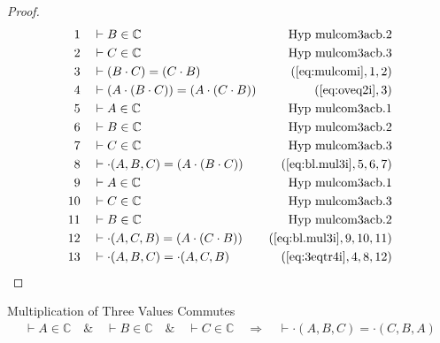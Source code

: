 \begin{proof}
\begin{align}
  1 &&  & \vdash B \in \mathbb{C}&\text{Hyp~mulcom3acb.2}\notag%
  \\ 2 &&  & \vdash C \in
\mathbb{C}&\text{Hyp~mulcom3acb.3}\notag%
  \\ 3 &&  & \vdash ( B \cdot C ) = ( C \cdot B )&(\mbox{\ref{eq:mulcomi}},1,2)\notag
  \\ 4 &&  & \vdash ( A \cdot ( B \cdot C ) ) = ( A \cdot ( C \cdot B ) )&(\mbox{\ref{eq:oveq2i}},3)\notag
  \\ 5 &&  & \vdash A \in
\mathbb{C}&\text{Hyp~mulcom3acb.1}\notag%
  \\ 6 &&  & \vdash B \in
\mathbb{C}&\text{Hyp~mulcom3acb.2}\notag%
  \\ 7 &&  & \vdash C \in
\mathbb{C}&\text{Hyp~mulcom3acb.3}\notag%
  \\ 8 &&  & \vdash \cdot( A , B , C ) = ( A \cdot ( B \cdot C ) )&(\mbox{\ref{eq:bl.mul3i}},5,6,7)\notag
  \\ 9 &&  & \vdash A \in
\mathbb{C}&\text{Hyp~mulcom3acb.1}\notag%
  \\ 10 &&  & \vdash C \in
\mathbb{C}&\text{Hyp~mulcom3acb.3}\notag%
  \\ 11 &&  & \vdash B \in
\mathbb{C}&\text{Hyp~mulcom3acb.2}\notag%
  \\ 12 &&  & \vdash \cdot( A , C , B ) = ( A \cdot ( C \cdot B ) )&(\mbox{\ref{eq:bl.mul3i}},9,10,11)\notag
  \\ 13 &&  & \vdash \cdot( A , B , C ) = \cdot( A , C , B )&(\mbox{\ref{eq:3eqtr4i}},4,8,12)\notag
\end{align}
\end{proof}

\begin{lemma} Multiplication of Three Values
Commutes
\begin{align}
\vdash A \in \mathbb{C}\quad\&\quad \vdash B \in \mathbb{C}\quad\&\quad \vdash
    C \in \mathbb{C}\quad\Rightarrow\quad \vdash \cdot( A , B , C ) = \cdot( C
    , B , A )\label{eq:bl.mulcom3cba}\tag{bl.mulcom3cba}
\end{align}
\end{lemma}

